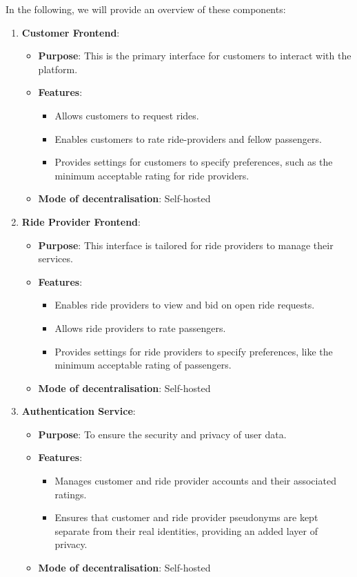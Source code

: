 In the following, we will provide an overview of these components:

\begin{enumerate}
    \item \textbf{Customer Frontend}:
    \begin{itemize}
        \item \textbf{Purpose}: This is the primary interface for customers to interact with the platform.
        \item \textbf{Features}:
        \begin{itemize}
            \item Allows customers to request rides.
            \item Enables customers to rate ride-providers and fellow passengers.
            \item Provides settings for customers to specify preferences, such as the minimum acceptable rating for ride providers.
        \end{itemize}
        \item \textbf{Mode of decentralisation}: Self-hosted 
    \end{itemize}

    \item \textbf{Ride Provider Frontend}:
    \begin{itemize}
        \item \textbf{Purpose}: This interface is tailored for ride providers to manage their services.
        \item \textbf{Features}:
        \begin{itemize}
            \item Enables ride providers to view and bid on open ride requests.
            \item Allows ride providers to rate passengers.
            \item Provides settings for ride providers to specify preferences, like the minimum acceptable rating of passengers.
        \end{itemize}
        \item \textbf{Mode of decentralisation}: Self-hosted 
    \end{itemize}

    \item \textbf{Authentication Service}:
    \begin{itemize}
        \item \textbf{Purpose}: To ensure the security and privacy of user data.
        \item \textbf{Features}:
        \begin{itemize}
            \item Manages customer and ride provider accounts and their associated ratings.
            \item Ensures that customer and ride provider pseudonyms are kept separate from their real identities, providing an added layer of privacy.
        \end{itemize}
        \item \textbf{Mode of decentralisation}: Self-hosted 
    \end{itemize}


\end{enumerate}
